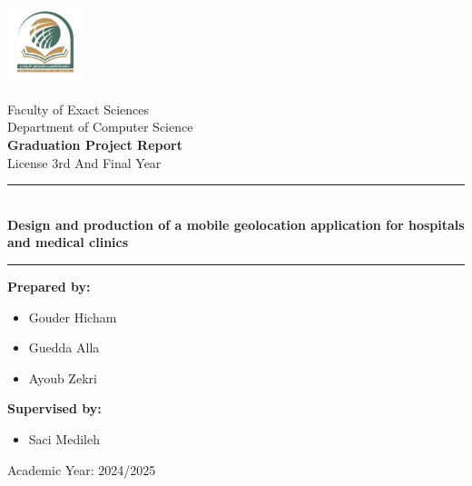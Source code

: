 \documentclass[12pt]{report}
\begin{document}
\begin{center}
\begin{center}
\begin{minipage}{0.1\textwidth}
			\centering
			\includegraphics[width=2.2cm]{images/uni_logo.jpg}
		\end{minipage}
	\end{center}
	\vspace{0.5cm}
	\fontsize{12}{20}\selectfont
	Faculty of Exact Sciences \\
	Department of Computer Science \\
	\vspace{0.5cm}
	\textbf{Graduation Project Report} \\
	License 3rd And Final Year \\
	\rule{0.85\linewidth}{0.5pt} \\[0.3cm]
	\textbf{\Large Design and production of a mobile geolocation application for hospitals and medical clinics}
	\rule{0.85\linewidth}{0.5pt}  \vspace{1cm}
	\begin{flushright}
		\begin{minipage}[t]{0.8\textwidth} %
			\begin{minipage}[t]{0.48\textwidth}
				\hspace*{-1.7cm}
				\textbf{Prepared by:} \\[-7.7ex]
				\begin{itemize} \setlength\itemsep{0em}
					\setlength\itemsep{-0.8em}
					\setlength{}
					\setlength{}
					\item \hspace*{-1.9cm} Gouder Hicham
					\item \hspace*{-1.9cm} Guedda Alla
					\item \hspace*{-1.9cm} Ayoub Zekri
				\end{itemize}

			\end{minipage}%
			\hfill
			\begin{minipage}[t]{0.48\textwidth}
				\hspace*{0.5cm}
				\textbf{Supervised by:} \\[-7.7ex]
				\begin{itemize} \setlength\itemsep{0em}
					\setlength\itemsep{-0.8em}
					\setlength{}
					\setlength{}
					\item \hspace*{0.3cm} Saci Medileh
				\end{itemize}
			\end{minipage}
		\end{minipage}
	\end{flushright}
	\vspace{5cm}
	\Large Academic Year: 2024/2025 \\
	\vfill
\end{center}
\end{document}
